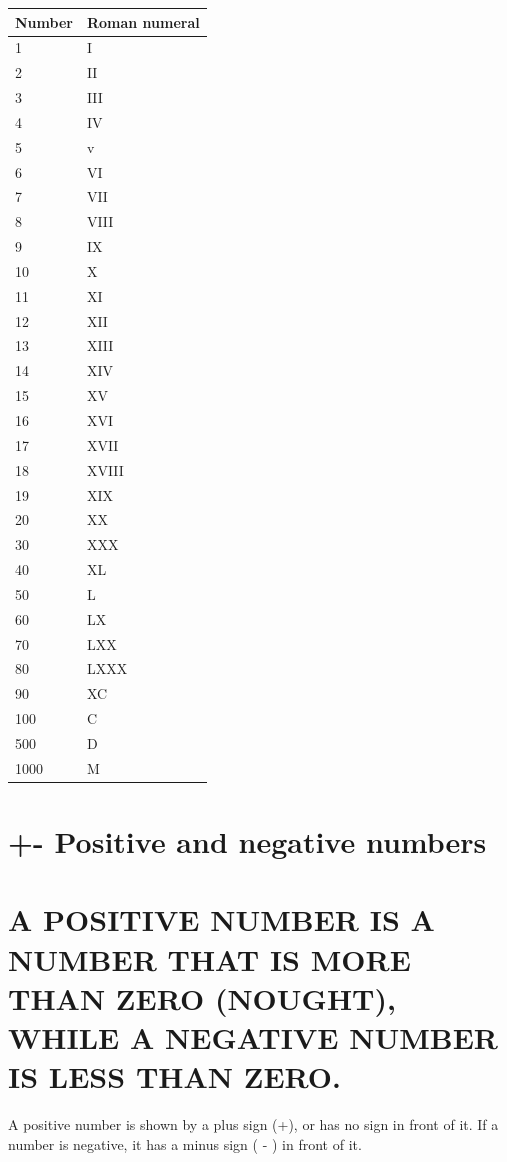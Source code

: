 \documentclass[10pt]{article}
\begin{document}
\begin{center}
\begin{tabular}{|l|l|}
\hline
Number & Roman numeral \\
\hline
1 & I \\
\hline
2 & II \\
\hline
3 & III \\
\hline
4 & IV \\
\hline
5 & v \\
\hline
6 & VI \\
\hline
7 & VII \\
\hline
8 & VIII \\
\hline
9 & IX \\
\hline
10 & X \\
\hline
11 & XI \\
\hline
12 & XII \\
\hline
13 & XIII \\
\hline
14 & XIV \\
\hline
15 & XV \\
\hline
16 & XVI \\
\hline
17 & XVII \\
\hline
18 & XVIII \\
\hline
19 & XIX \\
\hline
20 & XX \\
\hline
30 & XXX \\
\hline
40 & XL \\
\hline
50 & L \\
\hline
60 & LX \\
\hline
70 & LXX \\
\hline
80 & LXXX \\
\hline
90 & XC \\
\hline
100 & C \\
\hline
500 & D \\
\hline
1000 & M \\
\hline
\end{tabular}
\end{center}

\section*{+- Positive and negative numbers}
\section*{A POSITIVE NUMBER IS A NUMBER THAT IS MORE THAN ZERO (NOUGHT), WHILE A NEGATIVE NUMBER IS LESS THAN ZERO.}
A positive number is shown by a plus sign (+), or has no sign in front of it. If a number is negative, it has a minus sign ( - ) in front of it.
\end{document}
